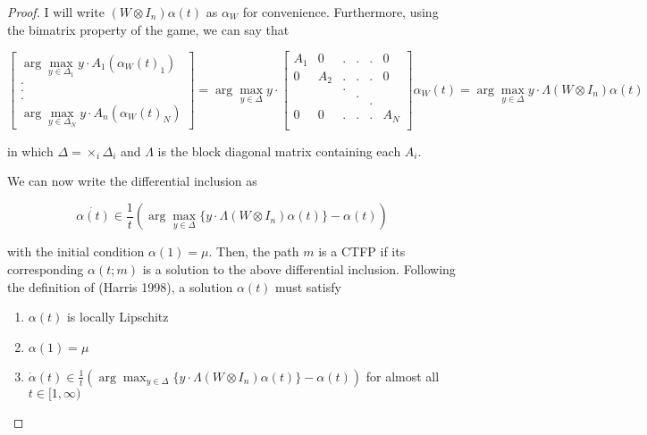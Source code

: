 \documentclass{article}
\theoremstyle{definition}
\begin{document}
\begin{proof}
		I will write $(W \otimes I_n) \alpha(t)$ as $\alpha_W$ for convenience. Furthermore, using
		the bimatrix property of the game, we can say that

		\begin{equation}
			\begin{bmatrix}
				\arg\max_{y \in \Delta_1} y \cdot A_1 ( \alpha_W(t)_1) \\
				.\\
				.\\
				.\\
				\arg \max_{y \in \Delta_N} y \cdot A_n (\alpha_W(t)_N) 
			\end{bmatrix} = 
			\arg \max_{y \in \Delta} y \cdot \begin{bmatrix}
				A_1 & 0 & . & . & . & 0 \\
				0 & A_2 & . & . & . & 0 \\
				& & . & & & \\
				& & & . & & \\
				& & & & . & \\
				0 & 0 & . & . & . & A_N \\
			\end{bmatrix} \alpha_W(t) = \arg\max_{y \in \Delta} y \cdot \Lambda (W \otimes I_n)
			\alpha(t)
		\end{equation}

		in which $\Delta = \times_i \Delta_i$ and $\Lambda$ is the block diagonal matrix containing
		each $A_i$. 

		We can now write the differential inclusion as

		\begin{equation}
			\dot{\alpha(t)} \in \frac{1}{t} (\arg \max_{y \in \Delta}  \{y \cdot \Lambda (W \otimes
			I_n)
			\alpha(t) \}- \alpha(t))
		\end{equation}

		with the initial condition $\alpha(1) = \mu$. Then, the path $m$ is a CTFP if its
		corresponding $\alpha(t; m)$ is a solution to the above differential inclusion. Following
		the definition of (Harris 1998), a solution $\alpha(t)$ must satisfy

		\begin{enumerate}
			\item $\alpha(t)$ is locally Lipschitz
			\item $\alpha(1) = \mu$
			\item $\dot{\alpha}(t) \in \frac{1}{t} (\arg \max_{y \in \Delta}  \{y \cdot \Lambda (W \otimes
			I_n)
			\alpha(t) \}- \alpha(t))$ for almost all $t \in [1, \infty)$ 
		\end{enumerate}


\end{proof}
\end{document}
